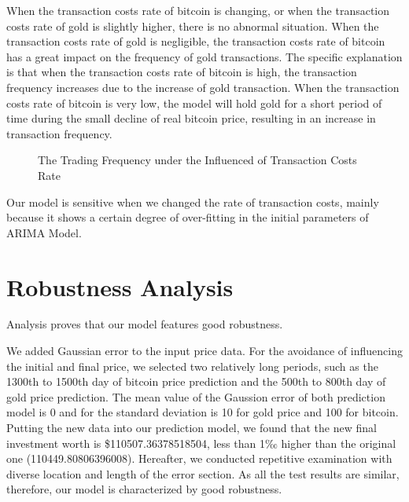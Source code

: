 \documentclass{mcmthesis}
\begin{document}
\begin{enumerate}
\par When the transaction costs rate of bitcoin is changing, or when the transaction costs rate of gold is slightly higher, there is no abnormal situation. When the transaction costs rate of gold is negligible, the transaction costs rate of bitcoin has a great impact on the frequency of gold transactions. The specific explanation is that when the transaction costs rate of bitcoin is high, the transaction frequency increases due to the increase of gold transaction. When the transaction costs rate of bitcoin is very low, the model will hold gold for a short period of time during the small decline of real bitcoin price, resulting in an increase in transaction frequency.

\begin{figure}[htbp]    %
  \centering            %
  \caption{The Trading Frequency under the Influenced of Transaction Costs Rate}    %
  \label{fig:subfig_1}            %
\end{figure}

\end{enumerate}

\par Our model is sensitive when we changed the rate of transaction costs, mainly because it shows a certain degree of over-fitting in the initial parameters of ARIMA Model. 

\section{Robustness Analysis}

\par Analysis proves that our model features good robustness.
\par We added Gaussian error to the input price data. For the avoidance of influencing the initial and final price, we selected two relatively long periods, such as the 1300th to 1500th day of bitcoin price prediction and the 500th to 800th day of gold price prediction. The mean value of the  Gaussion error of both prediction model is 0 and for the  standard deviation is 10 for gold price and 100 for bitcoin. Putting the new data into our prediction model, we found that the new final investment worth is \$110507.36378518504, less than 1‰ higher than the original one (110449.80806396008). Hereafter, we conducted repetitive examination with diverse location and length of the error section. As all the test results are similar, therefore, our model is characterized by good robustness.
\end{document}
